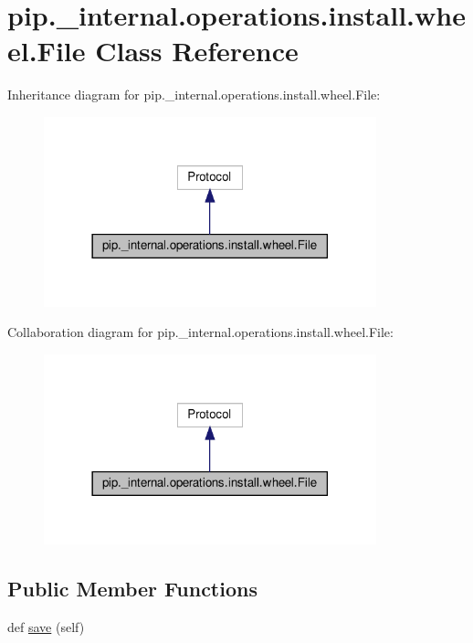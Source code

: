 \hypertarget{classpip_1_1__internal_1_1operations_1_1install_1_1wheel_1_1File}{}\section{pip.\+\_\+internal.\+operations.\+install.\+wheel.\+File Class Reference}
\label{classpip_1_1__internal_1_1operations_1_1install_1_1wheel_1_1File}


Inheritance diagram for pip.\+\_\+internal.\+operations.\+install.\+wheel.\+File\+:
\nopagebreak
\begin{figure}[H]
\begin{center}
\leavevmode
\includegraphics[width=273pt]{classpip_1_1__internal_1_1operations_1_1install_1_1wheel_1_1File__inherit__graph}
\end{center}
\end{figure}


Collaboration diagram for pip.\+\_\+internal.\+operations.\+install.\+wheel.\+File\+:
\nopagebreak
\begin{figure}[H]
\begin{center}
\leavevmode
\includegraphics[width=273pt]{classpip_1_1__internal_1_1operations_1_1install_1_1wheel_1_1File__coll__graph}
\end{center}
\end{figure}
\subsection*{Public Member Functions}
\begin{DoxyCompactItemize}
\item 
def \hyperlink{classpip_1_1__internal_1_1operations_1_1install_1_1wheel_1_1File_ab5a3026615c32c9ef662c56d53596557}{save} (self)
\end{DoxyCompactItemize}
